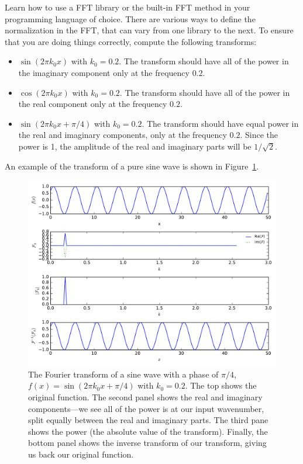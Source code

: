 \begin{exercise}[FFTs]
{Learn how to use a FFT library or the built-in FFT method in your
  programming language of choice.  There are various ways to define
  the normalization in the FFT, that can vary from one library to the
  next.  To ensure that you are doing things correctly, compute the
  following transforms:
  \begin{itemize}
  \item $\sin(2\pi k_0 x)$ with $k_0 = 0.2$.  The transform should
    have all of the power in the imaginary component only at the 
    frequency $0.2$.

  \item $\cos(2\pi k_0 x)$ with $k_0 = 0.2$.  The transform should
    have all of the power in the real component only at the 
    frequency $0.2$.

  \item $\sin(2\pi k_0 x + \pi/4)$ with $k_0 = 0.2$.  The transform should
    have equal power in the real and imaginary components, only at the 
    frequency $0.2$.  Since the power is 1, the amplitude of the real and
    imaginary parts will be $1/\sqrt{2}$.
  \end{itemize}

An example of the transform of a pure sine wave is shown in Figure~\ref{fig:intro:fft}.

}
\end{exercise}

\begin{figure}[t]
\centering
\includegraphics[width=\linewidth]{fft-sine-phase}
\caption[Fourier transform of $f(x) = \sin(2\pi k_0 x +
  \pi/4)$]{\label{fig:intro:fft} The Fourier transform of a sine wave
  with a phase of $\pi/4$, $f(x) = \sin(2\pi k_0 x + \pi/4)$ with $k_0
  = 0.2$.  The top shows the original function.  The second panel
  shows the real and imaginary components---we see all of the power is
  at our input wavenumber, split equally between the real and
  imaginary parts.  The third pane shows the power (the absolute value
  of the transform).  Finally, the bottom panel shows the inverse
  transform of our transform, giving us back our original function.}
\end{figure}





